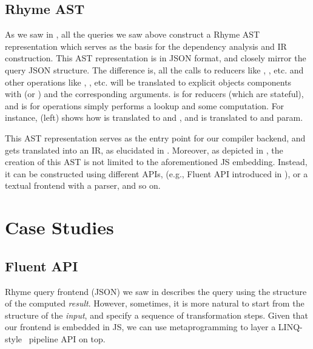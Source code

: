\documentclass[runningheads]{llncs}
\newcommand{\lang}{Rhyme}
\begin{document}

\vspace{-3mm}
\subsection{\lang{} AST}\label{subsec:ast}
\vspace{-2mm}
As we saw in , all the queries we
saw above construct a \lang{} AST representation which serves as the basis
for the dependency analysis and IR construction.
This AST representation is in JSON format, and closely mirror the query JSON structure.
The difference is, all the calls to reducers like , , etc.
and other operations like , , etc. will be translated to
explicit objects components with  (or ) and the corresponding
arguments.
 is for reducers (which are stateful), and  is for operations
simply performs a lookup and some computation.
For instance,  (left) shows how  is translated to 
and , and  is translated to  and param.

This AST representation serves as the entry point for our compiler backend, and gets
translated into an IR, as elucidated in .
Moreover, as depicted in , the creation of this AST is not
limited to the aforementioned JS embedding.
Instead, it can be constructed using different APIs, (e.g., Fluent API introduced in ),
or a textual frontend with a parser, and so on.

\section{Case Studies}\label{sec:case_studies}
\subsection{Fluent API}\label{subsec:fluent}
\lang{} query frontend (JSON) we saw in  describes the query
using the structure of the computed \emph{result}.
However, sometimes, it is more natural to start from the structure of the 
\emph{input}, and specify a sequence of transformation steps.
Given that our frontend is embedded in JS, we can use metaprogramming to
layer a LINQ-style~\cite{linq_sigmod} pipeline API on top.
\end{document}
